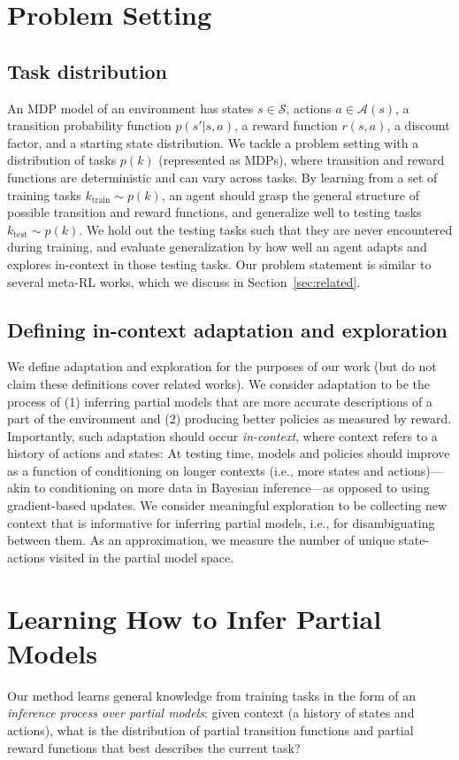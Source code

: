 \documentclass[sigconf]{aamas}
\begin{document}
\section{Problem Setting}\label{sec:problem-setting}
\subsection{Task distribution}
An MDP model of an environment has states $s \in \mathscr{S}$, actions $a \in \mathscr{A}(s)$, a transition probability function $p(s'|s,a)$, a reward function $r(s, a)$, a discount factor, and a starting state distribution. We tackle a problem setting with a distribution of tasks $p(k)$ (represented as MDPs), where transition and reward functions are deterministic and can vary across tasks. By learning from a set of training tasks $k_{\text{train}} \sim p(k)$, an agent should grasp the general structure of possible transition and reward functions, and generalize well to testing tasks $k_{\text{test}} \sim p(k)$. We hold out the testing tasks such that they are never encountered during training, and evaluate generalization by how well an agent adapts and explores in-context in those testing tasks. Our problem statement is similar to several meta-RL works, which we discuss in Section~\ref{sec:related}.
\subsection{Defining in-context adaptation and exploration}
We define adaptation and exploration for the purposes of our work (but do not claim these definitions cover related works). We consider adaptation to be the process of (1) inferring partial models that are more accurate descriptions of a part of the environment and (2) producing better policies as measured by reward. Importantly, such adaptation should occur \textit{in-context}, where context refers to a history of actions and states: At testing time, models and policies should improve as a function of conditioning on longer contexts (i.e., more states and actions)---akin to conditioning on more data in Bayesian inference---as opposed to using gradient-based updates. We consider meaningful exploration to be collecting new context that is informative for inferring partial models, i.e., for disambiguating between them. As an approximation, we measure the number of unique state-actions visited in the partial model space.
\section{Learning How to Infer Partial Models}
\label{sec:learning-how-to}
Our method learns general knowledge from training tasks in the form of an \textit{inference process over partial models}: given context (a history of states and actions), what is the distribution of partial transition functions and partial reward functions that best describes the current task?
\end{document}
